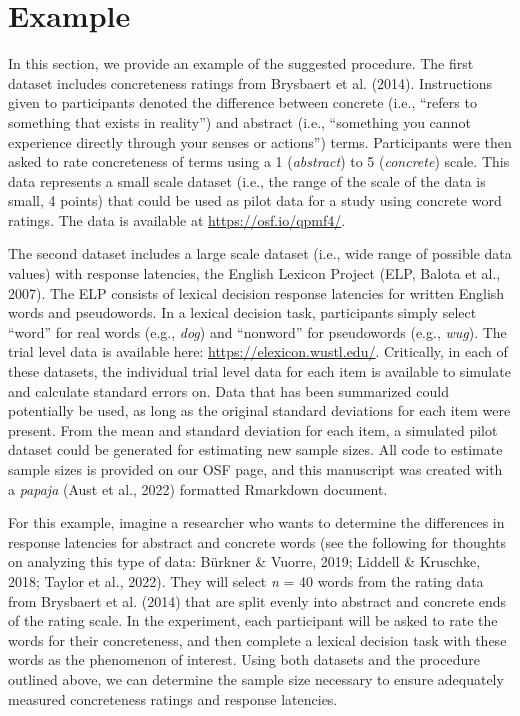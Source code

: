 \documentclass[
  man]{apa7}
\begin{document}
\section{Example}\label{example}

In this section, we provide an example of the suggested procedure. The first dataset includes concreteness ratings from Brysbaert et al. (2014). Instructions given to participants denoted the difference between concrete (i.e., ``refers to something that exists in reality'') and abstract (i.e., ``something you cannot experience directly through your senses or actions'') terms. Participants were then asked to rate concreteness of terms using a 1 (\emph{abstract}) to 5 (\emph{concrete}) scale. This data represents a small scale dataset (i.e., the range of the scale of the data is small, 4 points) that could be used as pilot data for a study using concrete word ratings. The data is available at \url{https://osf.io/qpmf4/}.

The second dataset includes a large scale dataset (i.e., wide range of possible data values) with response latencies, the English Lexicon Project (ELP, Balota et al., 2007). The ELP consists of lexical decision response latencies for written English words and pseudowords. In a lexical decision task, participants simply select ``word'' for real words (e.g., \emph{dog}) and ``nonword'' for pseudowords (e.g., \emph{wug}). The trial level data is available here: \url{https://elexicon.wustl.edu/}. Critically, in each of these datasets, the individual trial level data for each item is available to simulate and calculate standard errors on. Data that has been summarized could potentially be used, as long as the original standard deviations for each item were present. From the mean and standard deviation for each item, a simulated pilot dataset could be generated for estimating new sample sizes. All code to estimate sample sizes is provided on our OSF page, and this manuscript was created with a \emph{papaja} (Aust et al., 2022) formatted Rmarkdown document.

For this example, imagine a researcher who wants to determine the differences in response latencies for abstract and concrete words (see the following for thoughts on analyzing this type of data: Bürkner \& Vuorre, 2019; Liddell \& Kruschke, 2018; Taylor et al., 2022). They will select \emph{n} = 40 words from the rating data from Brysbaert et al. (2014) that are split evenly into abstract and concrete ends of the rating scale. In the experiment, each participant will be asked to rate the words for their concreteness, and then complete a lexical decision task with these words as the phenomenon of interest. Using both datasets and the procedure outlined above, we can determine the sample size necessary to ensure adequately measured concreteness ratings and response latencies.
\end{document}
